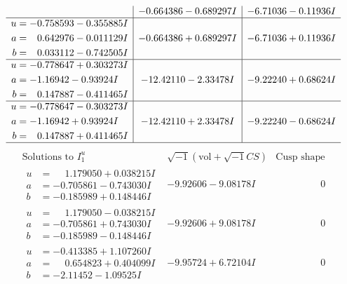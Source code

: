 \documentclass[1p]{elsarticle_modified}
\theoremstyle{definition}
\newcommand{\I}{\sqrt{-1}}
\begin{document}
$$\begin{array}{c|c|c}
 & -0.664386 - 0.689297 I & -6.71036 - 0.11936 I \\ \hline\begin{aligned}
u &= -0.758593 - 0.355885 I \\
a &= \phantom{-}0.642976 - 0.011129 I \\
b &= \phantom{-}0.033112 - 0.742505 I\end{aligned}
 & -0.664386 + 0.689297 I & -6.71036 + 0.11936 I \\ \hline\begin{aligned}
u &= -0.778647 + 0.303273 I \\
a &= -1.16942 - 0.93924 I \\
b &= \phantom{-}0.147887 - 0.411465 I\end{aligned}
 & -12.42110 - 2.33478 I & -9.22240 + 0.68624 I \\ \hline\begin{aligned}
u &= -0.778647 - 0.303273 I \\
a &= -1.16942 + 0.93924 I \\
b &= \phantom{-}0.147887 + 0.411465 I\end{aligned}
 & -12.42110 + 2.33478 I & -9.22240 - 0.68624 I\\
 \hline 
 \end{array}$$\newpage$$\begin{array}{c|c|c}  
\text{Solutions to }I^u_{1}& \I (\text{vol} + \sqrt{-1}CS) & \text{Cusp shape}\\
 \hline 
\begin{aligned}
u &= \phantom{-}1.179050 + 0.038215 I \\
a &= -0.705861 - 0.743030 I \\
b &= -0.185989 + 0.148446 I\end{aligned}
 & -9.92606 - 9.08178 I & \phantom{-0.000000 } 0 \\ \hline\begin{aligned}
u &= \phantom{-}1.179050 - 0.038215 I \\
a &= -0.705861 + 0.743030 I \\
b &= -0.185989 - 0.148446 I\end{aligned}
 & -9.92606 + 9.08178 I & \phantom{-0.000000 } 0 \\ \hline\begin{aligned}
u &= -0.413385 + 1.107260 I \\
a &= \phantom{-}0.654823 + 0.404099 I \\
b &= -2.11452 - 1.09525 I\end{aligned}
 & -9.95724 + 6.72104 I & \phantom{-0.000000 } 0 \\ \hline\begin{aligned}

\end{aligned}
\end{array}$$
\end{document}
